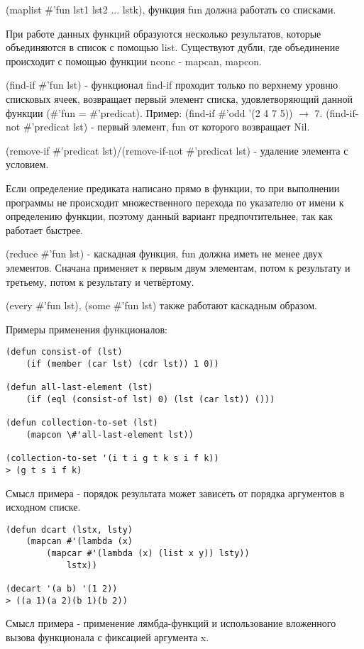 (maplist \#'fun lst1 lst2 ... lstk), функция fun должна работать со списками.

При работе данных функций образуются несколько результатов, которые объединяются в список с помощью list. Существуют дубли, где объединение происходит с помощью функции nconc - mapcan, mapcon.

(find-if \#'fun lst) - функционал find-if проходит только по верхнему уровню списковых ячеек, возвращает первый элемент списка, удовлетворяющий данной функции (\#'fun = \#'predicat). Пример: (find-if \#'odd '(2 4 7 5)) $\rightarrow$ 7. (find-if-not \#'predicat lst) - первый элемент, fun от которого возвращает Nil.

(remove-if \#'predicat lst)/(remove-if-not \#'predicat lst) - удаление элемента с условием.

Если определение предиката написано прямо в функции, то при выполнении программы не происходит множественного перехода по указателю от имени к определению функции, поэтому данный вариант предпочтительнее, так как работает быстрее.

(reduce \#'fun lst) - каскадная функция, fun должна иметь не менее двух элементов. Сначана применяет к первым двум элементам, потом к результату и третьему, потом к результату и четвёртому.

(every \#'fun lst), (some \#'fun lst) также работают каскадным образом.

Примеры применения функционалов:\\
\begin{lstlisting}
(defun consist-of (lst)
	(if (member (car lst) (cdr lst)) 1 0))

(defun all-last-element (lst)
	(if (eql (consist-of lst) 0) (lst (car lst)) ()))

(defun collection-to-set (lst)
	(mapcon \#'all-last-element lst))

(collection-to-set '(i t i g t k s i f k))
> (g t s i f k)
\end{lstlisting}
Смысл примера - порядок результата может зависеть от порядка аргументов в исходном списке.\\

\begin{lstlisting}
(defun dcart (lstx, lsty)
	(mapcan #'(lambda (x)
		(mapcar #'(lambda (x) (list x y)) lsty))
			lstx))

(decart '(a b) '(1 2))
> ((a 1)(a 2)(b 1)(b 2))
\end{lstlisting}
Смысл примера - применение лямбда-функций и использование вложенного вызова функционала с фиксацией аргумента x.

